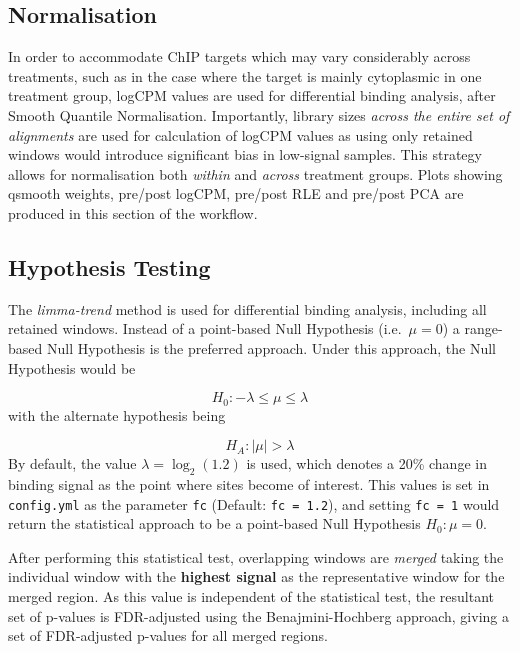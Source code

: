 \documentclass[
]{book}
\begin{document}
\hypertarget{normalisation}{%
\subsection*{Normalisation}\label{normalisation}}

In order to accommodate ChIP targets which may vary considerably across treatments, such as in the case where the target is mainly cytoplasmic in one treatment group, logCPM values are used for differential binding analysis, after Smooth Quantile Normalisation\citep{qsmooth}.
Importantly, library sizes \emph{across the entire set of alignments} are used for calculation of logCPM values as using only retained windows would introduce significant bias in low-signal samples.
This strategy allows for normalisation both \emph{within} and \emph{across} treatment groups.
Plots showing qsmooth weights, pre/post logCPM, pre/post RLE \citep{rle} and pre/post PCA are produced in this section of the workflow.

\hypertarget{hypothesis-testing}{%
\subsection*{Hypothesis Testing}\label{hypothesis-testing}}

The \emph{limma-trend}\citep{voom} method is used for differential binding analysis, including all retained windows.
Instead of a point-based Null Hypothesis (i.e.~\(\mu = 0\)) a range-based Null Hypothesis is the preferred approach\citep{treat}.
Under this approach, the Null Hypothesis would be

\[
H_0: -\lambda \leq \mu \leq \lambda
\]
with the alternate hypothesis being

\[
H_A: |\mu| > \lambda
\]
By default, the value \(\lambda = \log_2(1.2)\) is used, which denotes a 20\% change in binding signal as the point where sites become of interest.
This values is set in \texttt{config.yml} as the parameter \texttt{fc} (Default: \texttt{fc\ =\ 1.2}), and setting \texttt{fc\ =\ 1} would return the statistical approach to be a point-based Null Hypothesis \(H_0: \mu = 0\).

After performing this statistical test, overlapping windows are \emph{merged} taking the individual window with the \textbf{highest signal} as the representative window for the merged region.
As this value is independent of the statistical test\citep{csaw}, the resultant set of p-values is FDR-adjusted using the Benajmini-Hochberg approach\citep{fdr}, giving a set of FDR-adjusted p-values for all merged regions.
\end{document}

